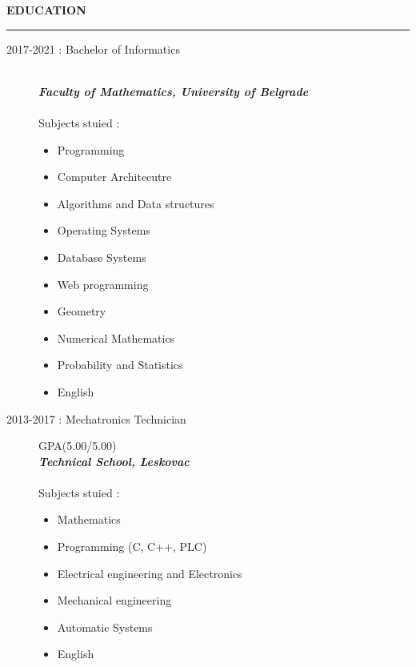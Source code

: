 \documentclass{article}
\begin{document}
\textbf{\large EDUCATION}\\
\color{my_col}\noindent\rule{15.4cm}{0.6pt}\color{black}
\begin{description}
    \item[ 2017-2021 : Bachelor of Informatics ]\hfill \\
    \textbf{\textit{Faculty of Mathematics, University of Belgrade}}\\
    \normalsize \\
    Subjects stuied :
     \begin{multicols}{2}
    \begin{itemize}
    \item Programming
    \item Computer Architecutre
    \item Algorithms and Data structures
    \item Operating Systems
    \item Database Systems
    \item Web programming
    \item Geometry
    \item Numerical Mathematics
    \item Probability and Statistics 
    \item English
    \end{itemize}
    \end{multicols}
\end{description}

\begin{description}
    \item[ 2013-2017 : Mechatronics Technician] GPA(5.00/5.00)\hfill \\
    \textbf{\textit{Technical School, Leskovac}}\\
    \normalsize \\
    Subjects stuied :
     \begin{multicols}{2}
    \begin{itemize}
    \item Mathematics
    \item Programming (C, C++, PLC)
    \item Electrical engineering and Electronics
    \item Mechanical engineering
    \item Automatic Systems
    \item English
    \end{itemize}
    \end{multicols}
\end{description}
\end{document}
